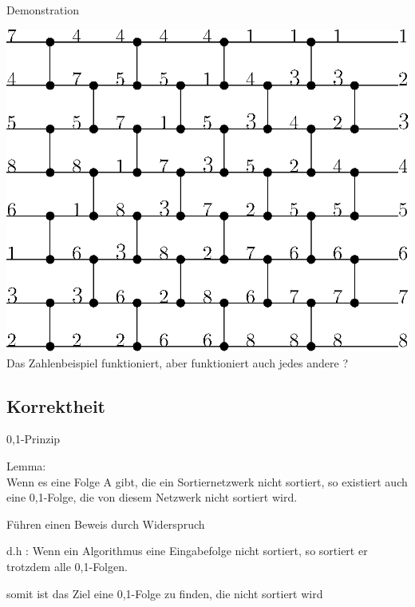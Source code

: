 \documentclass[ucs,9pt]{beamer}
\begin{document}
\begin{frame}{Demonstration}
\begin{center}
   \includegraphics[scale=0.8]{bild2beispiel.eps}\\
 {Das Zahlenbeispiel funktioniert, aber funktioniert auch jedes andere ?}\\
  \end{center}

\end{frame}

\subsection{Korrektheit}
\begin{frame}{0,1-Prinzip}
\vfill
{} {
\begin{center}
\begin{minipage}[c]{9cm}
Lemma: \\
Wenn es eine Folge A gibt, die ein Sor\-tier\-netz\-werk nicht sortiert, so existiert auch eine 0,1-Folge, die von diesem Netzwerk nicht sortiert wird.
\end{minipage}
\vfill
\end{center}
}
\begin{itemize}
 { \item Führen einen Beweis durch Widerspruch \\}
 { \item d.h : Wenn ein Algorithmus eine Eingabefolge nicht sortiert, so sortiert er trotzdem alle 0,1-Folgen. }
 { \item somit ist das Ziel eine 0,1-Folge zu finden, die nicht sortiert wird}
\end{itemize} 
\end{frame}
\end{document}
